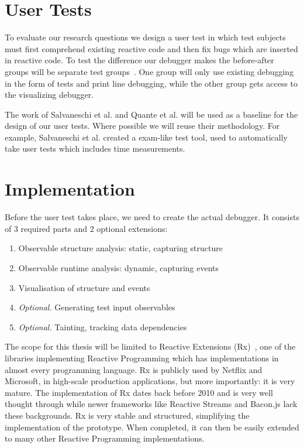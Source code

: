 \section{User Tests}%
To evaluate our research questions we design a user test in which test
subjects must first comprehend existing reactive code and then fix bugs
which are inserted in reactive code.  To test the difference our
debugger makes the before-after groups will be separate test groups~\cite
{salvaneschi2014empirical}.  One group will only use existing debugging
in the form of tests and print line debugging, while the other group
gets access to the visualizing debugger.

The work of Salvaneschi et al.  and Quante et al.  will be used as a
baseline for the design of our user tests.  Where possible we will reuse
their methodology.  For example, Salvaneschi et al.  created a exam-like
test tool, used to automatically take user tests which includes time
measurements.

\section{Implementation}%
Before the user test takes place, we need to create the actual debugger.
It consists of 3 required parts and 2 optional extensions:

\begin{enumerate}
    \item
        Observable structure analysis:  static, capturing structure
    \item
        Observable runtime analysis:  dynamic, capturing events
    \item
        Visualisation of structure and events
    \item
        \textit{Optional.} Generating test input observables
    \item
        \textit{Optional.} Tainting, tracking data dependencies
\end{enumerate}

The scope for this thesis will be limited to Reactive Extensions (Rx)~\cite
{msdn_rx}, one of the libraries implementing Reactive Programming which
has implementations in almost every programming language.  Rx is
publicly used by Netflix and Microsoft, in high-scale production
applications, but more importantly:  it is very mature.  The
implementation of Rx dates back before 2010 and is very well thought
through while newer frameworks like Reactive Streams and Bacon.js lack
these backgrounds.  Rx is very stable and structured, simplifying the
implementation of the prototype.  When completed, it can then be easily
extended to many other Reactive Programming implementations.

